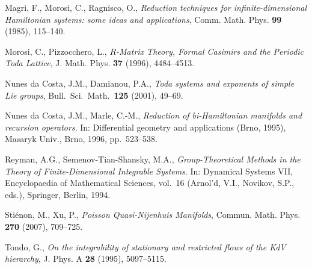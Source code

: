 \documentclass[12pt]{article}
\begin{document}
 Magri, F., Morosi, C., Ragnisco, O.,
{\it Reduction techniques for infinite-dimensional Hamiltonian systems: some ideas and applications},
Comm. Math. Phys. {\bf 99} (1985), 115--140. 

 Morosi, C., Pizzocchero, L., {\it $R$-Matrix Theory, Formal Casimirs and the Periodic Toda Lattice}, 
J. Math. Phys. {\bf 37} (1996), 4484--4513. 


Nunes da Costa, J.M., Damianou, P.A., 
{\it Toda systems and exponents of simple Lie groups}, 
Bull.\ Sci.\ Math.\ {\bf 125} (2001), 49--69.

 Nunes da Costa, J.M., Marle, C.-M., \emph{Reduction of bi-Hamiltonian manifolds and recursion operators}. In: Differential geometry and applications (Brno, 1995), Masaryk Univ., Brno, 1996, pp.\ 523--538. 



 Reyman, A.G., Semenov-Tian-Shansky, M.A., 
\emph{Group-Theoretical Methods in the Theory of Finite-Dimensional Integrable Systems}. 
In: Dynamical Systems VII, Encyclopaedia of Mathematical Sciences, vol.\ 16 (Arnol’d, V.I., Novikov, S.P., eds.), 
Springer, Berlin, 1994.

 Sti\'enon, M., Xu, P., {\it Poisson Quasi-Nijenhuis Manifolds}, Commun. Math. Phys. {\bf 270} (2007), 709--725.

 Tondo, G., {\it On the integrability of stationary and restricted flows of the KdV hierarchy}, 
J. Phys. A {\bf 28} (1995), 5097--5115.



\end{document}
